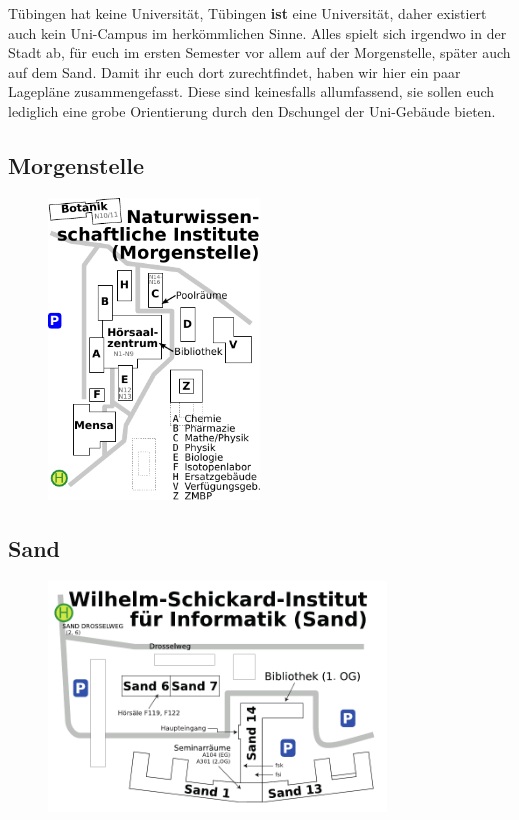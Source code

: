 Tübingen hat keine Universität, Tübingen \textbf{ist} eine Universität, daher existiert auch kein Uni-Campus im herkömmlichen Sinne. Alles spielt sich irgendwo in der Stadt ab, für euch im ersten Semester vor allem auf der Morgenstelle, später auch auf dem Sand. Damit ihr euch dort zurechtfindet, haben wir hier ein paar Lagepläne zusammengefasst. Diese sind keinesfalls allumfassend, sie sollen euch lediglich eine grobe Orientierung durch den Dschungel der Uni-Gebäude bieten.
\subsection*{Morgenstelle}
\begin{figure}[ht!]
\centering
\includegraphics[width=0.5\textwidth]{shared/anhang/lageplaene/uebersicht_morgenstelle.pdf}
\end{figure}
\newpage
\subsection*{Sand}
\begin{figure}[ht!]
	\centering
	\includegraphics[width=0.8\textwidth]{shared/anhang/lageplaene/uebersicht_sand.pdf}
\end{figure}
